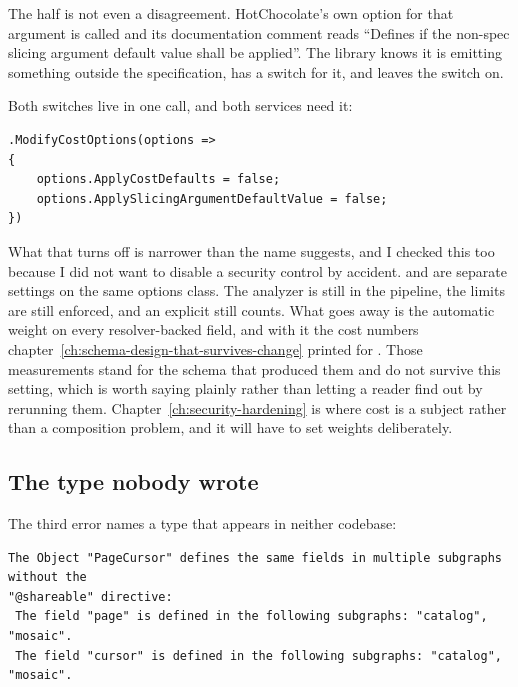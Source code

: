 The  half is not even a disagreement. HotChocolate's own option
for that argument is called  and its
documentation comment reads \enquote{Defines if the non-spec slicing argument
default value shall be applied}. The library knows it is emitting something
outside the specification, has a switch for it, and leaves the switch on.

Both switches live in one call, and both services need it:

\begin{verbatim}
.ModifyCostOptions(options =>
{
    options.ApplyCostDefaults = false;
    options.ApplySlicingArgumentDefaultValue = false;
})
\end{verbatim}

%
What that turns off is narrower than the name suggests, and I checked this too
because I did not want to disable a security control by accident.
 and  are separate settings on the
same options class. The analyzer is still in the pipeline, the limits are still
enforced, and an explicit \code{[Cost]} still counts. What goes away is the
automatic weight on every resolver-backed field, and with it the cost numbers
chapter~\ref{ch:schema-design-that-survives-change} printed for
. Those measurements stand for the schema that produced
them and do not survive this setting, which is worth saying plainly rather than
letting a reader find out by rerunning them.
Chapter~\ref{ch:security-hardening} is where cost is a subject rather than a
composition problem, and it will have to set weights deliberately.

\subsection*{The type nobody wrote}

%
The third error names a type that appears in neither codebase:

\begin{verbatim}
The Object "PageCursor" defines the same fields in multiple subgraphs without the
"@shareable" directive:
 The field "page" is defined in the following subgraphs: "catalog", "mosaic".
 The field "cursor" is defined in the following subgraphs: "catalog", "mosaic".
\end{verbatim}

